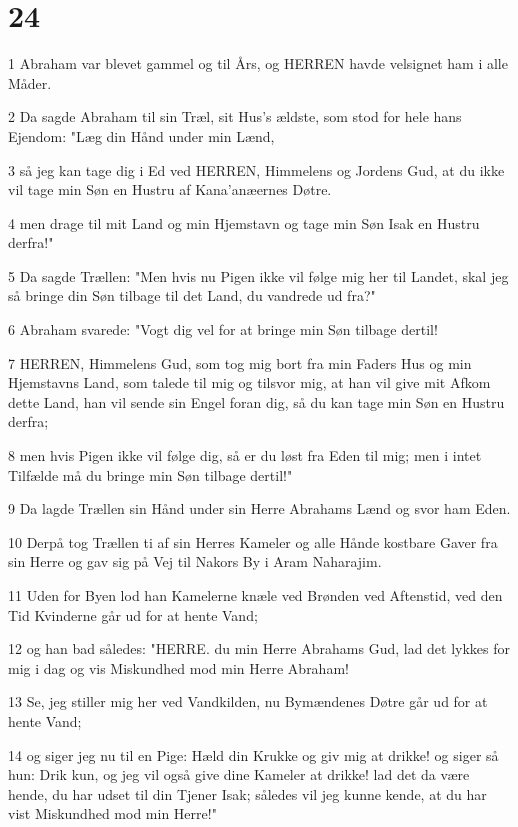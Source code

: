 \chapter{24}

\par 1 Abraham var blevet gammel og til Års, og HERREN havde velsignet ham i alle Måder.
\par 2 Da sagde Abraham til sin Træl, sit Hus's ældste, som stod for hele hans Ejendom: "Læg din Hånd under min Lænd,
\par 3 så jeg kan tage dig i Ed ved HERREN, Himmelens og Jordens Gud, at du ikke vil tage min Søn en Hustru af Kana'anæernes Døtre.
\par 4 men drage til mit Land og min Hjemstavn og tage min Søn Isak en Hustru derfra!"
\par 5 Da sagde Trællen: "Men hvis nu Pigen ikke vil følge mig her til Landet, skal jeg så bringe din Søn tilbage til det Land, du vandrede ud fra?"
\par 6 Abraham svarede: "Vogt dig vel for at bringe min Søn tilbage dertil!
\par 7 HERREN, Himmelens Gud, som tog mig bort fra min Faders Hus og min Hjemstavns Land, som talede til mig og tilsvor mig, at han vil give mit Afkom dette Land, han vil sende sin Engel foran dig, så du kan tage min Søn en Hustru derfra;
\par 8 men hvis Pigen ikke vil følge dig, så er du løst fra Eden til mig; men i intet Tilfælde må du bringe min Søn tilbage dertil!"
\par 9 Da lagde Trællen sin Hånd under sin Herre Abrahams Lænd og svor ham Eden.
\par 10 Derpå tog Trællen ti af sin Herres Kameler og alle Hånde kostbare Gaver fra sin Herre og gav sig på Vej til Nakors By i Aram Naharajim.
\par 11 Uden for Byen lod han Kamelerne knæle ved Brønden ved Aftenstid, ved den Tid Kvinderne går ud for at hente Vand;
\par 12 og han bad således: "HERRE. du min Herre Abrahams Gud, lad det lykkes for mig i dag og vis Miskundhed mod min Herre Abraham!
\par 13 Se, jeg stiller mig her ved Vandkilden, nu Bymændenes Døtre går ud for at hente Vand;
\par 14 og siger jeg nu til en Pige: Hæld din Krukke og giv mig at drikke! og siger så hun: Drik kun, og jeg vil også give dine Kameler at drikke! lad det da være hende, du har udset til din Tjener Isak; således vil jeg kunne kende, at du har vist Miskundhed mod min Herre!"
